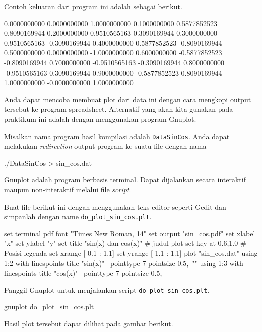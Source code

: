 \documentclass[a4paper,11pt]{extarticle}
\begin{document}
Contoh keluaran dari program ini adalah sebagai berikut.
\begin{textcode}
      0.0000000000       0.0000000000       1.0000000000
      0.1000000000       0.5877852523       0.8090169944
      0.2000000000       0.9510565163       0.3090169944
      0.3000000000       0.9510565163      -0.3090169944
      0.4000000000       0.5877852523      -0.8090169944
      0.5000000000       0.0000000000      -1.0000000000
      0.6000000000      -0.5877852523      -0.8090169944
      0.7000000000      -0.9510565163      -0.3090169944
      0.8000000000      -0.9510565163       0.3090169944
      0.9000000000      -0.5877852523       0.8090169944
      1.0000000000      -0.0000000000       1.0000000000
\end{textcode}

Anda dapat mencoba membuat plot dari data ini dengan cara mengkopi output tersebut
ke program spreadsheet.
Alternatif yang akan kita gunakan pada praktikum ini adalah dengan menggunakan
program \textsf{Gnuplot}.

Misalkan nama program hasil kompilasi adalah \texttt{DataSinCos}.
Anda dapat melakukan \textit{redirection} output program ke suatu file
dengan nama
\begin{textcode}
./DataSinCos > sin_cos.dat
\end{textcode}

Gnuplot adalah program berbasis terminal. Dapat dijalankan secara interaktif
maupun non-interaktif melalui file \textit{script}.

Buat file berikut ini dengan menggunakan teks editor seperti \textsf{Gedit}
dan simpanlah dengan name \texttt{do\_plot\_sin\_cos.plt}.
\begin{gnuplotcode}
set terminal pdf font "Times New Roman, 14"
set output "sin_cos.pdf"
set xlabel "x"
set ylabel "y"
set title "sin(x) dan cos(x)" # judul plot
set key at 0.6,1.0 # Posisi legenda
set xrange [-0.1 : 1.1]
set yrange [-1.1 : 1.1]
plot "sin_cos.dat" using 1:2 with linespoints title "sin(x)" \
                   pointtype 7 pointsize 0.5,\
                "" using 1:3 with linespoints title "cos(x)" \
                   pointtype 7 pointsize 0.5,
\end{gnuplotcode}

Panggil \textsf{Gnuplot} untuk menjalankan script \texttt{do\_plot\_sin\_cos.plt}.
\begin{textcode}
gnuplot do_plot_sin_cos.plt
\end{textcode}

Hasil plot tersebut dapat dilihat pada gambar berikut.
\end{document}
